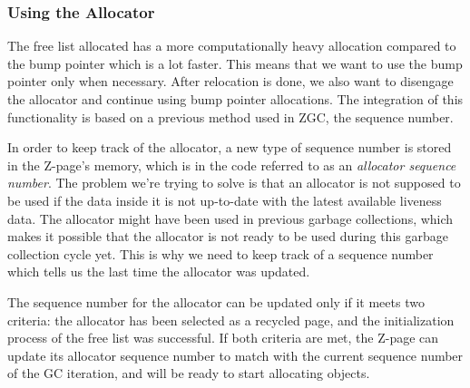 \subsubsection{Using the Allocator}
The free list allocated has a more computationally heavy allocation compared to the bump pointer which is a lot faster. This means that we want to use the bump pointer only when necessary. After relocation is done, we also want to disengage the allocator and continue using bump pointer allocations. The integration of this functionality is based on a previous method used in ZGC, the sequence number.

In order to keep track of the allocator, a new type of sequence number is stored in the Z-page's memory, which is in the code referred to as an \textit{allocator sequence number}. The problem we're trying to solve is that an allocator is not supposed to be used if the data inside it is not up-to-date with the latest available liveness data. The allocator might have been used in previous garbage collections, which makes it possible that the allocator is not ready to be used during this garbage collection cycle yet. This is why we need to keep track of a sequence number which tells us the last time the allocator was updated.

The sequence number for the allocator can be updated only if it meets two criteria: the allocator has been selected as a recycled page, and the initialization process of the free list was successful. If both criteria are met, the Z-page can update its allocator sequence number to match with the current sequence number of the GC iteration, and will be ready to start allocating objects.
